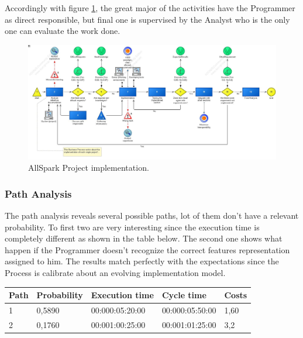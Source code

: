 Accordingly with figure \ref{2img:implementation}, the great major of the activities have the Programmer as direct responsible, but final one is supervised by the Analyst who is the only one can evaluate the work done.

\begin{figure}[ht!]
\begin{centering}
\includegraphics[scale=0.35, angle=90]{assign2/adonis/imgs/implementation.jpg}
\caption{AllSpark Project implementation.}
\label{2img:implementation}
\end{centering}
\end{figure}


\subsubsection{Path Analysis}
The path analysis reveals several possible paths, lot of them don't have a relevant probability. To first two are very interesting since the execution time is completely different as shown in the table below. The second one shows what happen if the Programmer doesn't recognize the correct features representation assigned to him. The results match perfectly with the expectations since the Process is calibrate about an evolving implementation model.

\begin{table}[ht!]
\centering
\begin{tabular}{|l|l|l|l|l|}
\hline
Path&Probability&Execution time&Cycle time&Costs\\
\hline
1&0,5890&00:000:05:20:00&00:000:05:50:00&1,60\\
\hline
2&0,1760&00:001:00:25:00&00:001:01:25:00&3,2\\
\hline
\end{tabular}
\end{table}

